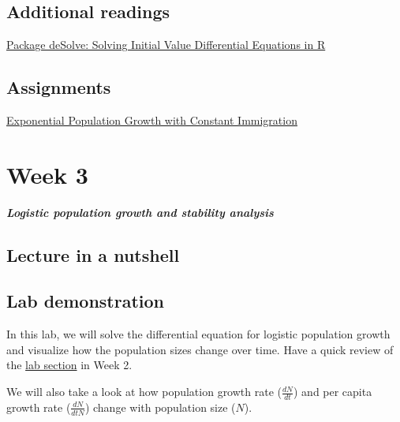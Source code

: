 \documentclass[
]{book}
\begin{document}
\hypertarget{additional-readings-1}{%
\section*{Additional readings}\label{additional-readings-1}}

\href{./Additional\%20readings/Package\%20deSolve\%20-\%20Solving\%20Initial\%20Value\%20Differential\%20Equations\%20in\%20R.pdf}{Package deSolve: Solving Initial Value Differential Equations in R}

\hypertarget{assignments-1}{%
\section*{Assignments}\label{assignments-1}}

\href{./Assignments/Week2_Exponential\%20Growth.pdf}{Exponential Population Growth with Constant Immigration}

\hypertarget{week-3}{%
\chapter*{Week 3}\label{week-3}}

\textbf{\emph{Logistic population growth and stability analysis}}

\hypertarget{lecture-in-a-nutshell-2}{%
\section*{Lecture in a nutshell}\label{lecture-in-a-nutshell-2}}

\hypertarget{lab-demonstration-2}{%
\section*{Lab demonstration}\label{lab-demonstration-2}}

In this lab, we will solve the differential equation for logistic population growth and visualize how the population sizes change over time. Have a quick review of the \href{https://genchanghsu.github.io/2021_Fall_Introduction_to_Theoretical_Ecology/week-2.html\#lab-demonstration-1}{lab section} in Week 2.

We will also take a look at how population growth rate (\(\frac{dN}{dt}\)) and per capita growth rate (\(\frac{dN}{dtN}\)) change with population size (\(N\)).
\end{document}
